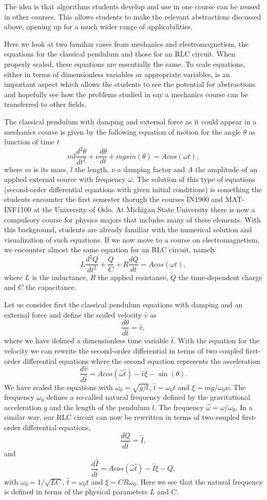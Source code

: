 \documentclass[graybox,envcountchap,sectrefs]{svmult}
\begin{document}
The idea is that algorithms students develop and use in one course can be
reused in other courses.  This allows  students to make the
relevant abstractions discussed above, opening up for a much wider
range of applicabilities.

Here we look at two familiar cases from
mechanics and electromagnetism, the equations for the classical
pendulum and those for an RLC circuit.  When properly scaled, these
equations are essentially the same. To scale equations,
either in terms of dimensionless variables or appropriate variables,
is an important aspect which allows the students to see the potential
for abstractions and hopefully see how the problems studied in say a
mechanics course can be transferred to other fields.

The classical pendulum with damping and external force as it could
appear in a mechanics course is given by the following equation of
motion for the angle $\theta$ as function of time $t$
\[
  ml\frac{d^2\theta}{dt^2}+\nu\frac{d\theta}{dt}  +mgsin(\theta)=Acos(\omega t),
\]
where $m$ is its mass, $l$ the length, $\nu$ a damping factor and $A$
the amplitude of an applied external source with frequency
$\omega$. The solution of this type of equations (second-order
differential equations with given initial conditions) is something the
students encounter the first semester thorugh the courses IN1900 and
MAT-INF1100 at the University of Oslo. At Michigan State University
there is now a compulsory course for physics majors that includes many
of these elements.  With this background, students are already familiar with
the numerical solution and visualization of such equations.
If we now
move to a course on electromagnetism, we encounter almost the same
equation for an RLC circuit, namely
\[
L\frac{d^2Q}{dt^2}+\frac{Q}{C}+R\frac{dQ}{dt}=Acos(\omega t),
\]
where $L$ is the inductance, $R$ the applied resistance, $Q$ the
time-dependent charge and $C$ the capacitance.

Let us consider first the classical pendulum equations with damping and an
external force and define the scaled velocity $\hat{v}$ as
\[
   \frac{d\theta}{d\hat{t}} =\hat{v},
\]
where we have defined a dimensionless time variable $\hat{t}$. With
the equation for the velocity we can rewrite the second-order
differential in terms of two coupled first-order differential
equations where the second equation represents the acceleration
\[
   \frac{d\hat{v}}{d\hat{t}} =Acos(\hat{\omega} \hat{t})-\hat{v}\xi-\sin(\theta).
\]
We have scaled the  equations with $\omega_0=\sqrt{g/l}$,
$\hat{t}=\omega_0 t$ and $\xi = mg/\omega_0\nu$. The frequency
$\omega_0$ defines a so-called natural frequency defined by the
gravitational acceleration $g$ and the length of the pendulum $l$. The
frequency $\hat{\omega}= \omega/\omega_0$.  In a similar way, our RLC
circuit can now be rewritten in terms of two coupled first-order
differential equations,
\[
   \frac{dQ}{d\hat{t}} =\hat{I},
\]
and
\[
   \frac{d\hat{I}}{d\hat{t}} =Acos(\hat{\omega} \hat{t})-\hat{I}\xi-Q,
\]
with $\omega_0=1/\sqrt{LC}$, $\hat{t}=\omega_0 t$ and $\xi =
CR\omega_0$. Here we see that the natural frequency is defined in
terms of the physical parameters $L$ and $C$.
\end{document}
